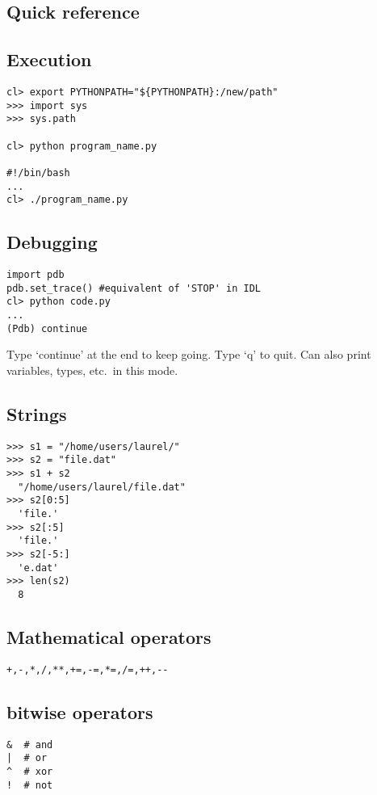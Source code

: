 \documentclass{article}
\begin{document}
\begin{multicols}{2}
\raggedcolumns
\section{Quick reference}
\setcounter{secnumdepth}{0}

\subsection{Execution}
\begin{lstlisting}
cl> export PYTHONPATH="${PYTHONPATH}:/new/path"
>>> import sys
>>> sys.path

cl> python program_name.py

#!/bin/bash
...
cl> ./program_name.py
\end{lstlisting}

\subsection{Debugging}
\begin{lstlisting}
import pdb
pdb.set_trace() #equivalent of 'STOP' in IDL
cl> python code.py
...
(Pdb) continue
\end{lstlisting}
Type `continue' at the end to keep going. Type `q' to quit.
Can also print variables, types, etc.\ in this mode.

\subsection{Strings}
\begin{lstlisting}
>>> s1 = "/home/users/laurel/"
>>> s2 = "file.dat"
>>> s1 + s2
  "/home/users/laurel/file.dat"
>>> s2[0:5]
  'file.'
>>> s2[:5]
  'file.'
>>> s2[-5:]
  'e.dat'
>>> len(s2)
  8
\end{lstlisting}

\subsection{Mathematical operators}
\begin{lstlisting}
+,-,*,/,**,+=,-=,*=,/=,++,--
\end{lstlisting}

\subsection{bitwise operators}
\begin{lstlisting}
&  # and
|  # or
^  # xor
!  # not
\end{lstlisting}


\end{multicols}
\end{document}
